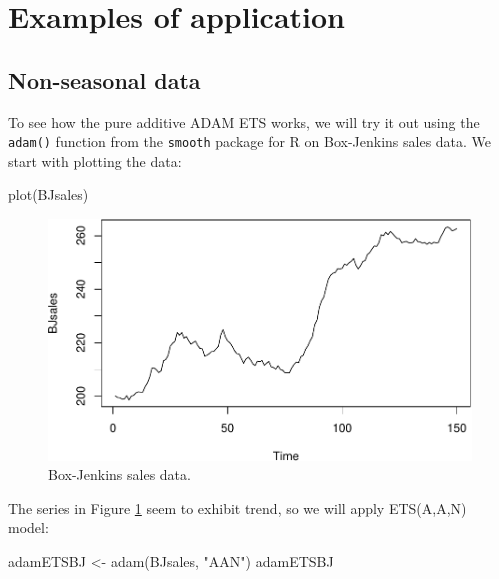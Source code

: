 \documentclass[
]{book}
\newenvironment{Shaded}{\begin{snugshade}}{\end{snugshade}}
\newcommand{\FunctionTok}[1]{\textcolor[rgb]{0.00,0.00,0.00}{#1}}
\newcommand{\NormalTok}[1]{#1}
\newcommand{\OtherTok}[1]{\textcolor[rgb]{0.56,0.35,0.01}{#1}}
\newcommand{\StringTok}[1]{\textcolor[rgb]{0.31,0.60,0.02}{#1}}
\theoremstyle{definition}
\theoremstyle{definition}
\theoremstyle{definition}
\theoremstyle{definition}
\theoremstyle{remark}
\begin{document}
\hypertarget{ADAMETSPureAdditiveExamples}{%
\section{Examples of application}\label{ADAMETSPureAdditiveExamples}}

\hypertarget{non-seasonal-data}{%
\subsection{Non-seasonal data}\label{non-seasonal-data}}

To see how the pure additive ADAM ETS works, we will try it out using the \texttt{adam()} function from the \texttt{smooth} package for R on Box-Jenkins sales data. We start with plotting the data:

\begin{Shaded}
\begin{Highlighting}[]
\FunctionTok{plot}\NormalTok{(BJsales)}
\end{Highlighting}
\end{Shaded}

\begin{figure}
\centering
\includegraphics{Svetunkov--2022----ADAM_files/figure-latex/BJsalesDataPlot-1.pdf}
\caption{\label{fig:BJsalesDataPlot}Box-Jenkins sales data.}
\end{figure}

The series in Figure \ref{fig:BJsalesDataPlot} seem to exhibit trend, so we will apply ETS(A,A,N) model:

\begin{Shaded}
\begin{Highlighting}[]
\NormalTok{adamETSBJ }\OtherTok{\textless{}{-}} \FunctionTok{adam}\NormalTok{(BJsales, }\StringTok{"AAN"}\NormalTok{)}
\NormalTok{adamETSBJ}
\end{Highlighting}
\end{Shaded}
\end{document}
